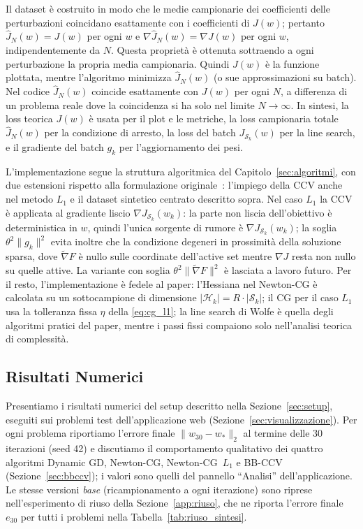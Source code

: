 \documentclass[a4paper,12pt]{article}
\numberwithin{equation}{section}
\numberwithin{figure}{section}
\numberwithin{table}{section}
\begin{document}
Il dataset è costruito in modo che le medie campionarie dei coefficienti
delle perturbazioni coincidano esattamente con i coefficienti di
$J(w)$; pertanto $\hat J_N(w) = J(w)$ per ogni $w$ e
$\nabla \hat J_N(w) = \nabla J(w)$ per ogni $w$, indipendentemente da $N$.
Questa proprietà è ottenuta sottraendo a ogni perturbazione la propria media
campionaria. Quindi $J(w)$ è la funzione plottata, mentre l'algoritmo
minimizza $\hat J_N(w)$ (o sue approssimazioni su batch). Nel codice
$\hat J_N(w)$ coincide esattamente con $J(w)$ per ogni $N$, a differenza di
un problema reale dove la coincidenza si ha solo nel limite $N \to \infty$.
In sintesi, la loss teorica $J(w)$ è usata per il plot e le metriche, la loss
campionaria totale $\hat J_N(w)$ per la condizione di arresto, la loss del
batch $J_{\mathcal{S}_k}(w)$ per la line search, e il gradiente del batch
$g_k$ per l'aggiornamento dei pesi.

L'implementazione segue la struttura algoritmica del
Capitolo~\ref{sec:algoritmi}, con due estensioni rispetto alla formulazione
originale~\cite{byrd2012}: l'impiego della CCV anche nel metodo $L_1$ e il dataset
sintetico centrato descritto sopra. Nel caso $L_1$ la CCV è applicata al
gradiente liscio $\nabla J_{\mathcal{S}_k}(w_k)$: la parte non liscia
dell'obiettivo è deterministica in $w$, quindi l'unica sorgente di rumore è
$\nabla J_{\mathcal{S}_k}(w_k)$; la soglia $\theta^2\|g_k\|^2$ evita inoltre che
la condizione degeneri in prossimità della soluzione sparsa, dove
$\widetilde{\nabla}F$ è nullo sulle coordinate dell'active set mentre $\nabla J$
resta non nullo su quelle attive. La variante con soglia
$\theta^2\|\widetilde{\nabla}F\|^2$ è lasciata a lavoro futuro. Per il resto, l'implementazione è fedele
al paper: l'Hessiana nel Newton-CG è calcolata su un sottocampione di
dimensione $|\mathcal{H}_k| = R \cdot |\mathcal{S}_k|$; il CG per il caso
$L_1$ usa la tolleranza fissa $\eta$ della \eqref{eq:cg_l1}; la line search
di Wolfe è quella degli algoritmi pratici del paper, mentre i passi fissi
compaiono solo nell'analisi teorica di complessità.

\subsection{Risultati Numerici}\label{sec:risultati}

Presentiamo i risultati numerici del setup descritto nella
Sezione~\ref{sec:setup}, eseguiti sui problemi test dell'applicazione web
(Sezione~\ref{sec:visualizzazione}). Per ogni problema riportiamo l'errore
finale $\|w_{30}-w_*\|_2$ al termine delle 30 iterazioni (seed 42) e
discutiamo il comportamento qualitativo dei quattro algoritmi Dynamic GD,
Newton-CG, Newton-CG~$L_1$ e BB-CCV (Sezione~\ref{sec:bbccv}); i valori sono quelli del pannello ``Analisi''
dell'applicazione. Le stesse versioni \emph{base} (ricampionamento a ogni
iterazione) sono riprese nell'esperimento di riuso della
Sezione~\ref{app:riuso}, che ne riporta l'errore finale $e_{30}$ per tutti i
problemi nella Tabella~\ref{tab:riuso_sintesi}.
\end{document}
